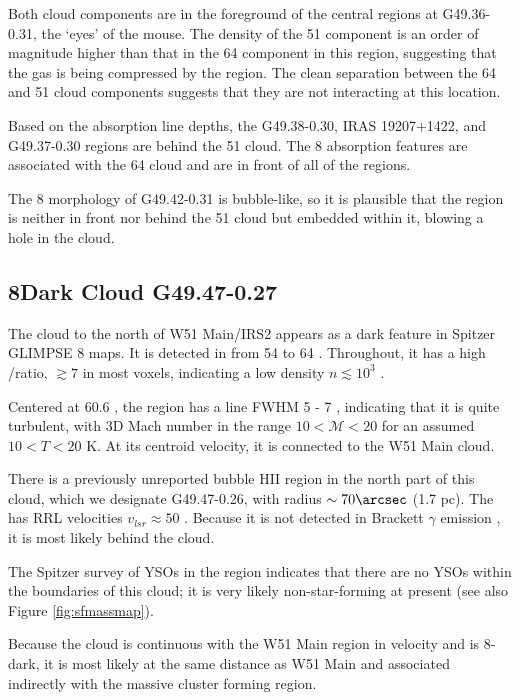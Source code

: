 Both cloud components are in the foreground of the central \hii regions at
G49.36-0.31, the `eyes' of the mouse.  The density of the 51 \kms component is
an order of magnitude higher than that in the 64 \kms component in this region,
suggesting that the gas is being compressed by the \hii region.
The clean separation between the 64 and 51 \kms cloud components suggests that
they are not interacting at this location.  

Based on the absorption line depths, the G49.38-0.30, IRAS 19207+1422, and
G49.37-0.30 \hii regions are behind the 51 \kms cloud.  The 8 \um absorption
features are associated with the 64 \kms cloud and are in front of all of the
\hii regions.

The 8 \um morphology of G49.42-0.31 is bubble-like, so it is plausible that the
\hii region is neither in front nor behind the 51 \kms cloud but embedded
within it, blowing a hole in the cloud.

\subsection{8\um Dark Cloud G49.47-0.27}
The cloud to the north of W51 Main/IRS2 appears as a dark feature in Spitzer
GLIMPSE 8 \um maps.  It is detected in \formaldehyde from 54 to 64
\kms.  Throughout, it has a high \oneone/\twotwo ratio, $\gtrsim7$ in
most voxels, indicating a low density $n\lesssim10^3$ \percc. 


Centered at 60.6 \kms, the region has a line FWHM 5 - 7 \kms, indicating that
it is quite turbulent, with 3D Mach number in the range $10 < \mathcal{M} < 20$
for an assumed $10 < T < 20$ K.  At its centroid velocity, it is connected
to the W51 Main cloud.

There is a previously unreported bubble HII region in the north part of this
cloud, which we designate G49.47-0.26, with radius $\sim70\arcsec$ (1.7 pc).
The \hii has RRL velocities $v_{lsr}\approx50$ \kms.  Because it is not detected
in Brackett $\gamma$ emission \citep[from the UWISH2
survey:][]{Froebrich2011a}, it is most likely behind the cloud.

The \citet{Kang2009a} Spitzer survey of YSOs in the region indicates that there
are no YSOs within the boundaries of this cloud; it is very likely
non-star-forming at present (see also Figure \ref{fig:sfmassmap}).

Because the cloud is continuous with the W51 Main region in velocity and is
8\um-dark, it is most likely at the same distance as W51 Main and
associated indirectly with the massive cluster forming region.

